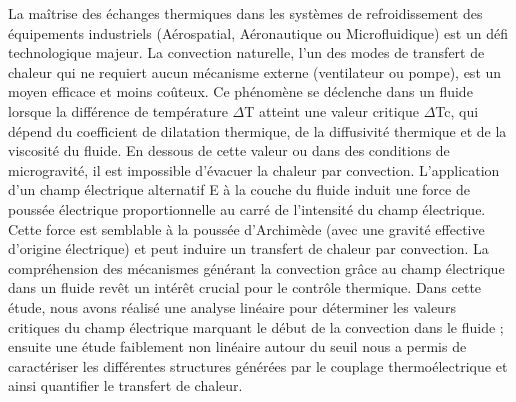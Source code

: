 {\normalsize
La maîtrise des échanges thermiques dans les systèmes de refroidissement des équipements industriels (Aérospatial, Aéronautique ou Microfluidique) est un défi technologique majeur. La convection naturelle, l'un des modes de transfert de chaleur qui ne requiert aucun mécanisme externe (ventilateur ou pompe), est un moyen efficace et moins coûteux. Ce phénomène se déclenche dans un fluide lorsque la différence de température $\Delta$T atteint une valeur critique $\Delta$Tc, qui dépend du coefficient de dilatation thermique, de la diffusivité thermique et de la viscosité du fluide. En dessous de cette valeur ou dans des conditions de microgravité, il est impossible d'évacuer la chaleur par convection. L'application d'un champ électrique alternatif E à la couche du fluide induit une force de poussée électrique proportionnelle au carré de l'intensité du champ électrique. Cette force est semblable à la poussée d'Archimède (avec une gravité effective d'origine électrique) et peut induire un transfert de chaleur par convection. La compréhension des mécanismes générant la convection grâce au champ électrique dans un fluide revêt un intérêt crucial pour le contrôle thermique. Dans cette étude, nous avons réalisé une analyse linéaire pour déterminer les valeurs critiques du champ électrique marquant le début de la convection dans le fluide ; ensuite une étude faiblement non linéaire autour du seuil nous a permis de caractériser les différentes structures générées par le couplage thermoélectrique et ainsi quantifier le transfert de chaleur.







}
